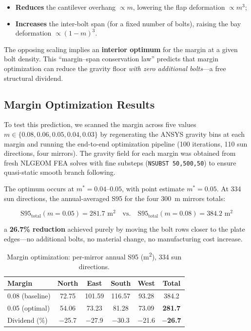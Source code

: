 \documentclass{CVM}
\begin{document}
\begin{itemize}
  \item \textbf{Reduces} the cantilever overhang $\propto m$, lowering the
  flap deformation $\propto m^3$;
  \item \textbf{Increases} the inter-bolt span (for a fixed number of bolts),
  raising the bay deformation $\propto (1-m)^3$.
\end{itemize}

The opposing scaling implies an \textbf{interior optimum} for the margin at a
given bolt density. This ``margin--span conservation law'' predicts that
margin optimization can reduce the gravity floor \emph{with zero additional
bolts}---a free structural dividend.

\subsection{Margin Optimization Results}

To test this prediction, we scanned the margin across five values
$m \in \{0.08, 0.06, 0.05, 0.04, 0.03\}$ by regenerating the ANSYS gravity
bins at each margin and running the end-to-end optimization pipeline (100
iterations, 110 sun directions, four mirrors). The gravity field for each
margin was obtained from fresh NLGEOM FEA solves with fine substeps
(\verb|NSUBST 50,500,50|) to ensure quasi-static smooth branch following.

The optimum occurs at $m^* = 0.04$--$0.05$, with point estimate $m^* = 0.05$.
At 334 sun directions, the annual-averaged S95 for the four \SI{300}{\meter}
mirrors totals:

\begin{equation}
\text{S95}_{\text{total}}(m{=}0.05) = 281.7\text{ m}^2 \quad\text{vs.}\quad
\text{S95}_{\text{total}}(m{=}0.08) = 384.2\text{ m}^2
\label{eq:final}
\end{equation}

a \textbf{26.7\% reduction} achieved purely by moving the bolt rows closer to
the plate edges---no additional bolts, no material change, no manufacturing
cost increase.

\begin{table}[t]
\centering
\caption{Margin optimization: per-mirror annual S95 (m\textsuperscript{2}),
334 sun directions.}
\label{tab:margin}
\small
\begin{tabular}{lccccc}
\toprule
Margin & North & East & South & West & Total \\
\midrule
0.08 (baseline) & 72.75 & 101.59 & 116.57 & 93.28 & 384.2 \\
0.05 (optimal)  & 54.06 &  73.23 &  81.28 & 73.09 & \textbf{281.7} \\
\midrule
Dividend (\%)    & $-$25.7 & $-$27.9 & $-$30.3 & $-$21.6 & \textbf{$-$26.7} \\
\bottomrule
\end{tabular}
\end{table}
\end{document}
